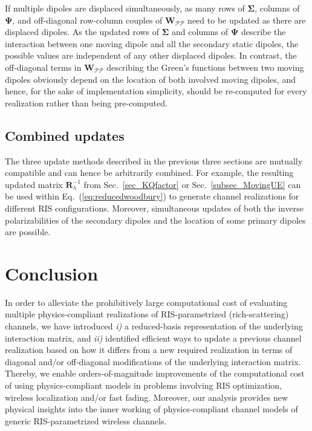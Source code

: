 \documentclass[journal,12pt,onecolumn,draftclsnofoot]{IEEEtran}
\begin{document}
If multiple dipoles are displaced simultaneously, as many rows of $\mathbf{\Sigma}$, columns of $\mathbf{\Psi}$, and off-diagonal row-column couples of $\mathbf{W}_\mathcal{PP}$ need to be updated as there are displaced dipoles. As the updated rows of $\mathbf{\Sigma}$ and columns of $\mathbf{\Psi}$ describe the interaction between one moving dipole and all the secondary static dipoles, the possible values are independent of any other displaced dipoles. In contrast, the off-diagonal terms in $\mathbf{W}_\mathcal{PP}$ describing the Green's functions between two moving dipoles obviously depend on the location of both involved moving dipoles, and hence, for the sake of implementation simplicity, should be re-computed for every realization rather than being pre-computed.


\subsection{Combined updates}
\label{subsec_combinedUpdate}

The three update methods described in the previous three sections are mutually compatible and can hence be arbitrarily combined. 
For example, the resulting updated matrix $\mathbf{R}^{-1}_{\lambda}$ from Sec.~\ref{sec_KQfactor} or Sec.~\ref{subsec_MovingUE} can be used within Eq.~(\ref{eq:reducedwoodbury}) to generate channel realizations for different RIS configurations. Moreover, simultaneous updates of both the inverse polarizabilities of the secondary dipoles and the location of some primary dipoles are possible.


\section{Conclusion}\label{sec_Conclusion}

In order to alleviate the prohibitively large computational cost of evaluating multiple physics-compliant realizations of RIS-parametrized (rich-scattering) channels, we have introduced \textit{i)} a reduced-basis representation of the underlying interaction matrix, and \textit{ii)} identified efficient ways to update a previous channel realization based on how it differs from a new required realization in terms of diagonal and/or off-diagonal modifications of the underlying interaction matrix.
Thereby, we enable orders-of-magnitude improvements of the  computational cost of using physics-compliant models in problems involving RIS optimization, wireless localization and/or fast fading.
Moreover, our analysis provides new physical insights into the inner working of physics-compliant channel models of generic RIS-parametrized wireless channels.
\end{document}
